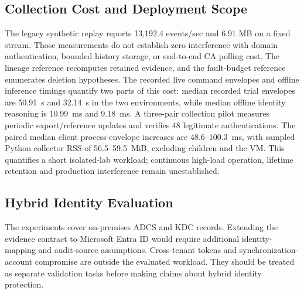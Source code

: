 \subsection{Collection Cost and Deployment Scope}
The legacy synthetic replay reports 13,192.4 events/sec and 6.91 MB on a fixed stream. Those measurements do not establish zero interference with domain authentication, bounded history storage, or end-to-end CA polling cost. The lineage reference recomputes retained evidence, and the fault-budget reference enumerates deletion hypotheses. The recorded live command envelopes and offline inference timings quantify two parts of this cost: median recorded trial envelopes are 50.91~s and 32.14~s in the two environments, while median offline identity reasoning is 10.99~ms and 9.18~ms. A three-pair collection pilot measures periodic export/reference updates and verifies 48 legitimate authentications. The paired median client process-envelope increases are 48.6--100.3~ms, with sampled Python collector RSS of 56.5--59.5~MiB, excluding children and the VM. This quantifies a short isolated-lab workload; continuous high-load operation, lifetime retention and production interference remain unestablished.

\subsection{Hybrid Identity Evaluation}
The experiments cover on-premises ADCS and KDC records. Extending the evidence contract to Microsoft Entra ID would require additional identity-mapping and audit-source assumptions. Cross-tenant tokens and synchronization-account compromise are outside the evaluated workload. They should be treated as separate validation tasks before making claims about hybrid identity protection.

